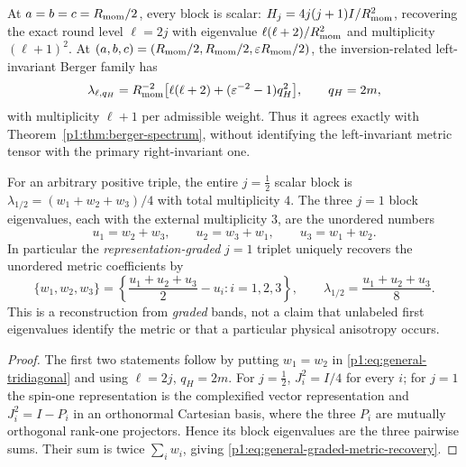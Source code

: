 \documentclass[11pt]{article}
\begin{document}
\begin{corollary}
\label{p1:cor:general-spectral-consistency-and-recovery}
At $a=b=c=R_{\mathrm{mom}}/2$, every block is scalar:
$H_j=4j(j+1)I/R_{\mathrm{mom}}^2$, recovering the exact round
level $\ell=2j$ with eigenvalue $\ell(\ell+2)/R_{\mathrm{mom}}^2$ and multiplicity
$(\ell+1)^2$.  At
$(a,b,c)=(R_{\mathrm{mom}}/2,R_{\mathrm{mom}}/2,\varepsilon R_{\mathrm{mom}}/2)$, the inversion-related
left-invariant Berger family has
\[
 \lambda_{\ell,q_H}
 =R_{\mathrm{mom}}^{-2}\bigl[\ell(\ell+2)
       +(\varepsilon^{-2}-1)q_H^2\bigr],
 \qquad q_H=2m,
\]
with multiplicity $\ell+1$ per admissible weight.  Thus it agrees exactly
with Theorem~\ref{p1:thm:berger-spectrum}, without identifying the
left-invariant metric tensor with the primary right-invariant one.

For an arbitrary positive triple, the entire $j=\tfrac12$ scalar block is
$\lambda_{1/2}=(w_1+w_2+w_3)/4$ with total multiplicity $4$.
The three $j=1$ block eigenvalues, each with the external multiplicity
$3$, are the unordered numbers
\[
  u_1=w_2+w_3,\qquad u_2=w_3+w_1,\qquad u_3=w_1+w_2.
\]
In particular the \emph{representation-graded} $j=1$ triplet uniquely
recovers the unordered metric coefficients by
\begin{equation}\label{p1:eq:general-graded-metric-recovery}
  \{w_1,w_2,w_3\}
  =\left\{\frac{u_1+u_2+u_3}{2}-u_i:i=1,2,3\right\},
  \qquad \lambda_{1/2}=\frac{u_1+u_2+u_3}{8}.
\end{equation}
This is a reconstruction from \emph{graded} bands, not a claim that
unlabeled first eigenvalues identify the metric or that a particular
physical anisotropy occurs.
\end{corollary}
\begin{proof}
The first two statements follow by putting $w_1=w_2$ in
\eqref{p1:eq:general-tridiagonal} and using $\ell=2j$, $q_H=2m$.
For $j=\tfrac12$, $J_i^2=I/4$ for every $i$; for $j=1$ the
spin-one representation is the complexified vector representation and
$J_i^2=I-P_i$ in an orthonormal Cartesian basis, where the three $P_i$
are mutually orthogonal rank-one projectors.  Hence its block eigenvalues
are the three pairwise sums.  Their sum is twice $\sum_iw_i$,
giving \eqref{p1:eq:general-graded-metric-recovery}.
\end{proof}
\end{document}
